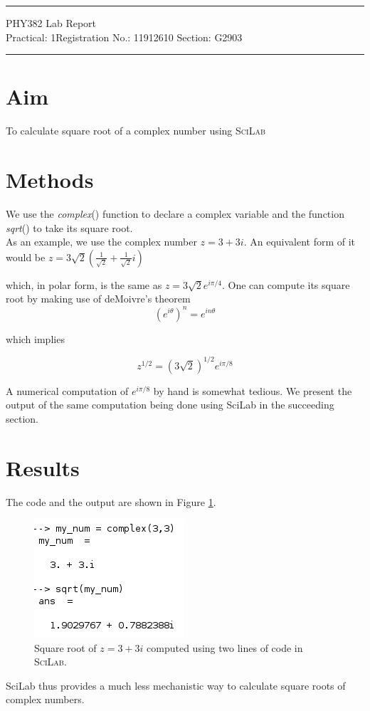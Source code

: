 \documentclass{article}
\begin{document}
	
	\author{Aayush Arya}
	\date{(Submitted: \today)}
	\title{}
	
	\maketitle
	
	\hrule
	\begin{center}
		PHY382 Lab Report\\
		Practical: 1\quad Registration No.: 11912610 \quad Section: G2903
	\end{center}
	\hrule
	
	\section*{Aim}
	To calculate square root of a complex number using \textsc{SciLab}
	
	\section*{Methods}
	We use the \textit{complex}() function to declare a complex variable and the function \textit{sqrt}() to take its square root.\\
	
	As an example, we use the complex number $z = 3 +3i$. An equivalent form of it would be $z=3 \sqrt{2} \left( \frac{1}{\sqrt{2}} + \frac{1}{\sqrt{2}}i \right)$
	
	which, in polar form, is the same as $z = 3\sqrt{2}e^{i\pi/4}$. One can compute its square root by making use of deMoivre's theorem $$(e^{i\theta})^n = e^{in\theta}$$
	
	which implies
	
	$$ z^{1/2} = (3\sqrt{2})^{1/2}e^{i\pi/8}$$
	
	A numerical computation of $e^{i\pi/8}$ by hand is somewhat tedious. We present the output of the same computation being done using SciLab in the succeeding section.
	
	\section*{Results}
	The code and the output are shown in Figure \ref{fig:sqrt}.

	\begin{figure}[h!]
		\centering
		\includegraphics{sqrt_complex}
		\caption{Square root of $z=3+3i$ computed using two lines of code in \textsc{SciLab}.}
		\label{fig:sqrt}
	\end{figure}
	
	SciLab thus provides a much less mechanistic way to calculate square roots of complex numbers.
	
\end{document}
